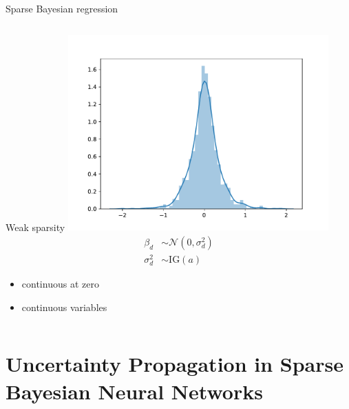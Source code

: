 \documentclass[9pt]{beamer}
\begin{document}
\begin{frame}{Sparse Bayesian regression}
\begin{columns}
    \begin{column}{0.5\textwidth}
      \centering
      \begin{block}{Weak sparsity}
        \includegraphics[width=0.75\textwidth]{sparse/weak_sparse}
        \begin{align*}
          \beta_d & \sim \mathcal{N}(0, \sigma^2_d) \\
          \sigma^2_d & \sim \text{IG}(a)
        \end{align*}
        \begin{itemize}
          \item continuous at zero
          \item continuous variables
        \end{itemize}
      \end{block}
      \end{column}
    \end{columns}
\end{frame}

\section{Uncertainty Propagation in Sparse Bayesian Neural Networks}
\end{document}
